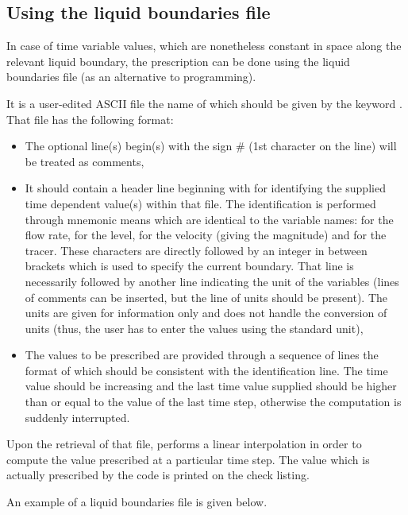 \subsection{Using the liquid boundaries file}
\label{sec:liqbnd}
In case of time variable values, which are nonetheless constant in space along
the relevant liquid boundary, the prescription can be done using the liquid
boundaries file (as an alternative to programming).

It is a user-edited ASCII file the name of which should be given by the keyword
. That file has the
following format:

\begin{itemize}
\item The optional line(s) begin(s) with the sign $\#$ (1st character on the
line) will be treated as comments,

\item It should contain a header line beginning with  for identifying
the supplied time dependent value(s) within that file. The identification is
performed through mnemonic means which are identical to the variable names:
 for the flow rate,  for the level, 
for the velocity (giving the magnitude) and  for the
tracer. These characters are directly followed by an integer in between
brackets which is used to specify the current boundary. That line is
necessarily followed by another line indicating the unit of the variables
(lines of comments can be inserted, but the line of units should be present).
The units are given for information only and  does not handle the
conversion of units (thus, the user has to enter the values using the standard
unit),

\item The values to be prescribed are provided through a sequence of lines the
format of which should be consistent with the identification line. The time
value should be increasing and the last time value supplied should be higher
than or equal to the value of the last time step, otherwise the computation is
suddenly interrupted.
\end{itemize}

Upon the retrieval of that file,  performs a linear interpolation in
order to compute the value prescribed at a particular time step. The value
which is actually prescribed by the code is printed on the check listing.

An example of a liquid boundaries file is given below.

